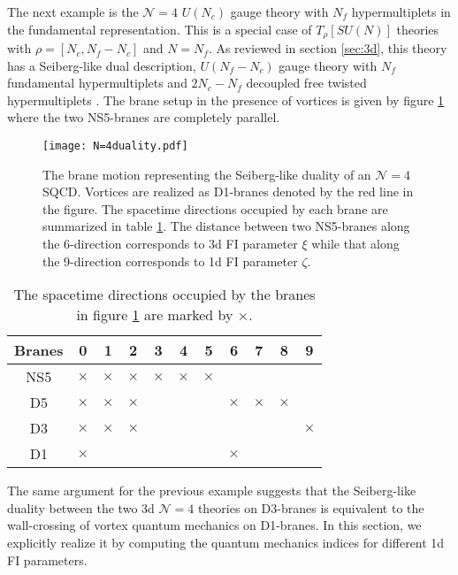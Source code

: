 \documentclass[a4paper,11pt]{article}
\begin{document}
The next example is the $\mathcal N = 4$ $U(N_c)$ gauge theory with $N_f$ hypermultiplets in the fundamental representation. This is a special case of $T_\rho [SU(N)]$ theories with $\rho = [N_c,N_f-N_c]$ and $N = N_f$. As reviewed in section \ref{sec:3d}, this theory has a Seiberg-like dual description, $U(N_f-N_c)$ gauge theory with $N_f$ fundamental hypermultiplets and $2 N_c-N_f$ decoupled free twisted hypermultiplets \cite{Kim:2012uz,Yaakov:2013fza,Gaiotto:2013bwa}. The brane setup in the presence of vortices is given by figure \ref{fig:N=4 duality} where the two NS5-branes are completely parallel.
%
\begin{figure}[tbp]
\centering %
\texttt{[image: N=4duality.pdf]}
\caption{\label{fig:N=4 duality} The brane motion representing the Seiberg-like duality of an $\mathcal N = 4$ SQCD. Vortices are realized as D1-branes denoted by the red line in the figure. The spacetime directions occupied by each brane are summarized in table \ref{tab:N=4 branes}. The distance between two NS5-branes along the 6-direction corresponds to 3d FI parameter $\xi$ while that along the 9-direction corresponds to 1d FI parameter $\zeta$.}
\end{figure}
%
%
\begin{table}[tbp]
\centering
\begin{tabular}{|c|cccccccccc|}
\hline
Branes & 0 & 1 & 2 & 3 & 4 & 5 & 6 & 7 & 8 & 9 \\
\hline
NS5 & $\times$ & $\times$ & $\times$ & $\times$ & $\times$ & $\times$ & & & & \\
D5 & $\times$ & $\times$ & $\times$ & & & & $\times$ & $\times$ & $\times$ & \\
D3 & $\times$ & $\times$ & $\times$ & & & & & & & $\times$ \\
D1 & $\times$ & & & & & & $\times$ & & & \\
\hline
\end{tabular}
\caption{\label{tab:N=4 branes} The spacetime directions occupied by the branes in figure \ref{fig:N=4 duality} are marked by $\times$.}
\end{table}
%
The same argument for the previous example suggests that the Seiberg-like duality between the two 3d $\mathcal N = 4$ theories on D3-branes is equivalent to the wall-crossing of vortex quantum mechanics on D1-branes. In this section, we explicitly realize it by computing the quantum mechanics indices for different 1d FI parameters.
\\
\end{document}
